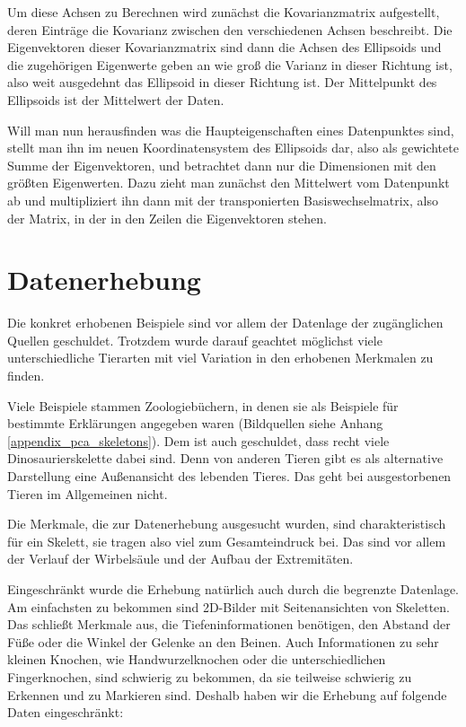  Um diese Achsen zu Berechnen wird zunächst die Kovarianzmatrix aufgestellt, deren Einträge die Kovarianz zwischen den verschiedenen Achsen beschreibt.
 Die Eigenvektoren dieser Kovarianzmatrix sind dann die Achsen des Ellipsoids und die zugehörigen Eigenwerte geben an wie groß die Varianz in dieser Richtung ist, also weit ausgedehnt das Ellipsoid in dieser Richtung ist. Der Mittelpunkt des Ellipsoids ist der Mittelwert der Daten.
 
 Will man nun herausfinden was die Haupteigenschaften eines Datenpunktes sind, stellt man ihn im neuen Koordinatensystem des Ellipsoids dar, also als gewichtete Summe der Eigenvektoren, und betrachtet dann nur die Dimensionen mit den größten Eigenwerten. Dazu zieht man zunächst den Mittelwert vom Datenpunkt ab und multipliziert ihn dann mit der transponierten Basiswechselmatrix, also der Matrix, in der in den Zeilen die Eigenvektoren stehen.


 \section{Datenerhebung}
 
 Die konkret erhobenen Beispiele sind vor allem der Datenlage \bzw der zugänglichen Quellen geschuldet. Trotzdem wurde darauf geachtet möglichst viele unterschiedliche Tierarten mit viel Variation in den erhobenen Merkmalen zu finden.
 
 Viele Beispiele stammen Zoologiebüchern, in denen sie als Beispiele für bestimmte Erklärungen angegeben waren (Bildquellen siehe Anhang \ref{appendix_pca_skeletons}). Dem ist auch geschuldet, dass recht viele Dinosaurierskelette dabei sind. Denn von anderen Tieren gibt es als alternative Darstellung eine Außenansicht des lebenden Tieres. Das geht bei ausgestorbenen Tieren im Allgemeinen nicht.
 
 Die Merkmale, die zur Datenerhebung ausgesucht wurden, sind charakteristisch für ein Skelett, sie tragen also viel zum Gesamteindruck bei. Das sind vor allem der Verlauf der Wirbelsäule und der Aufbau der Extremitäten.
  
 Eingeschränkt wurde die Erhebung natürlich auch durch die begrenzte Datenlage. Am einfachsten zu bekommen sind 2D-Bilder mit Seitenansichten von Skeletten. Das schließt Merkmale aus, die Tiefeninformationen benötigen, \zb den Abstand der Füße oder die Winkel der Gelenke an den Beinen. Auch Informationen zu sehr kleinen Knochen, wie Handwurzelknochen oder die unterschiedlichen Fingerknochen, sind schwierig zu bekommen, da sie teilweise schwierig zu Erkennen und zu Markieren sind. Deshalb haben wir die Erhebung auf folgende Daten eingeschränkt:
  
